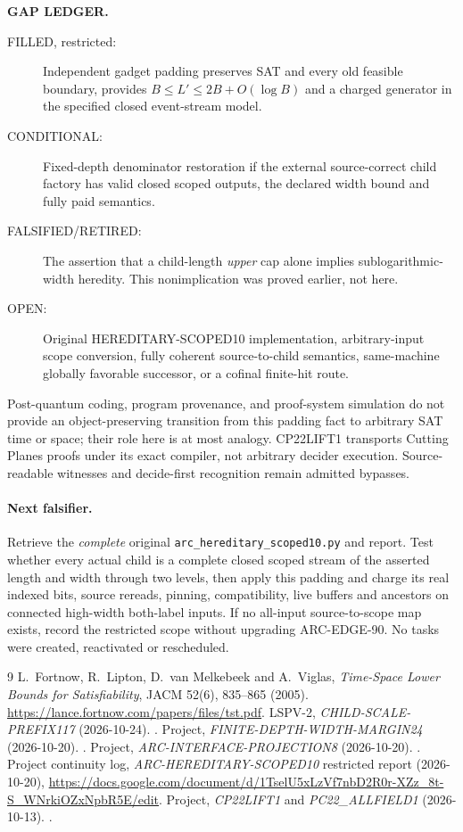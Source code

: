 \documentclass[11pt]{article}
\begin{document}
\noindent\textbf{GAP LEDGER.}
\begin{description}
\item[FILLED, restricted:] Independent gadget padding
preserves SAT and every old feasible boundary,
provides $B\le L'\le2B+O(\log B)$
and a charged generator in the specified
closed event-stream model.
\item[CONDITIONAL:] Fixed-depth denominator
restoration if the external source-correct
child factory has valid closed scoped outputs,
the declared width bound and fully paid semantics.
\item[FALSIFIED/RETIRED:] The assertion that
a child-length \emph{upper} cap alone
implies sublogarithmic-width heredity.
This nonimplication was proved earlier, not here.
\item[OPEN:] Original HEREDITARY-SCOPED10
implementation, arbitrary-input scope conversion,
fully coherent source-to-child semantics,
same-machine globally favorable successor,
or a cofinal finite-hit route.
\end{description}
Post-quantum coding, program provenance, and
proof-system simulation do not provide an
object-preserving transition from this padding
fact to arbitrary SAT time or space; their role
here is at most analogy. CP22LIFT1 transports
Cutting Planes proofs under its exact compiler,
not arbitrary decider execution. Source-readable
witnesses and decide-first recognition remain
admitted bypasses.

\paragraph{Next falsifier.}
Retrieve the \emph{complete} original
\texttt{arc\_hereditary\_scoped10.py} and report.
Test whether every actual child is a
complete closed scoped stream of the asserted
length and width through two levels, then apply
this padding and charge its real indexed bits,
source rereads, pinning, compatibility,
live buffers and ancestors on connected
high-width both-label inputs. If no all-input
source-to-scope map exists, record the
restricted scope without upgrading ARC-EDGE-90.
No tasks were created, reactivated or rescheduled.

\begin{thebibliography}{9}
 L.~Fortnow, R.~Lipton,
D.~van Melkebeek and A.~Viglas,
\emph{Time-Space Lower Bounds for Satisfiability},
JACM 52(6), 835--865 (2005).
\url{https://lance.fortnow.com/papers/files/tst.pdf}.
 LSPV-2,
\emph{CHILD-SCALE-PREFIX117} (2026-10-24).
.
 Project,
\emph{FINITE-DEPTH-WIDTH-MARGIN24} (2026-10-20).
.
 Project,
\emph{ARC-INTERFACE-PROJECTION8} (2026-10-20).
.
 Project continuity log,
\emph{ARC-HEREDITARY-SCOPED10} restricted
report (2026-10-20),
\url{https://docs.google.com/document/d/1TselU5xLzVf7nbD2R0r-XZz_8t-S_WNrkiOZxNpbR5E/edit}.
 Project,
\emph{CP22LIFT1} and
\emph{PC22\_ALLFIELD1} (2026-10-13).
.
\end{thebibliography}
\end{document}
